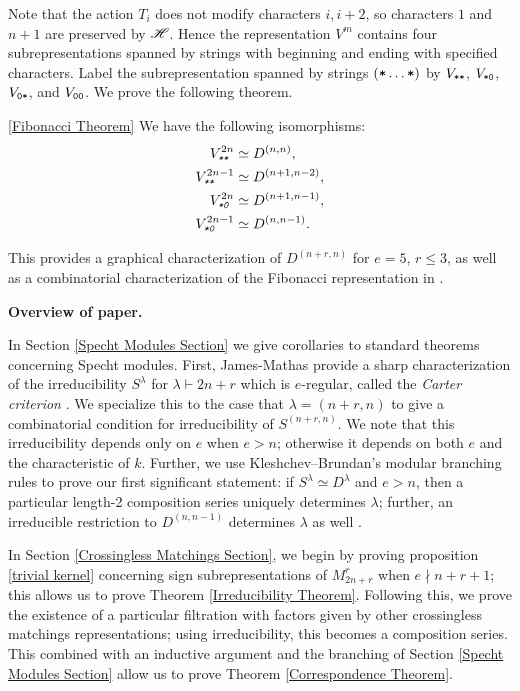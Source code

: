 \documentclass{amsart}
\def\thmcolor{black!60!orange}
\newcommand{\fakesubsection}[1]{
    \vspace{7pt}
    \noindent \textbf{#1.}
  }
\begin{document}
  Note that the action $T_i$ does not modify characters $i,i+2$, so characters $1$ and $n+1$ are preserved by $\mathscr{H}$.
  Hence the representation $V^m$ contains four subrepresentations spanned by strings with beginning and ending with specified characters.
  Label the subrepresentation spanned by strings $(\texttt{*}\dots\texttt{*})$ by $V_{\texttt{*}\texttt{*}}$, $V_{\texttt{*}\texttt{0}}$, $V_{\texttt{0}\texttt{*}}$, and $V_{\texttt{0}\texttt{0}}$.
  We prove the following theorem.
  \begingroup
  \hypersetup{linkcolor=\thmcolor}
  \begin{customthm}{\ref{Fibonacci Theorem}}
    We have the following isomorphisms:
    \begin{align*}  
      \emph{$V^{2n}_{\texttt{*}\texttt{*}}$} &\simeq D^{(n,n)},\\ 
      \emph{$V^{2n-1}_{\texttt{*}\texttt{*}}$} &\simeq D^{(n+1,n-2)},\\
      \emph{$V^{2n}_{\texttt{*}\texttt{0}}$} &\simeq D^{(n+1,n-1)},\\
      \emph{$V^{2n-1}_{\texttt{*}\texttt{0}}$} &\simeq D^{(n,n-1)}.
    \end{align*}
  \end{customthm}
  \endgroup
  This provides a graphical characterization of $D^{(n+r,n)}$ for $e = 5$, $r \leq 3$, as well as a combinatorial characterization of the Fibonacci representation in \cite{Shor}.

  \fakesubsection{Overview of paper}
  
  In Section \ref{Specht Modules Section} we give corollaries to standard theorems concerning Specht modules.
  First, James-Mathas provide a sharp characterization of the irreducibility $S^\lambda$ for $\lambda \vdash 2n + r$ which is $e$-regular, called the \emph{Carter criterion} \cite[Thm.~5.42]{Mathas-book}.
  We specialize this to the case that $\lambda = (n+r,n)$ to give a combinatorial condition for irreducibility of $S^{(n+r,n)}$.
  We note that this irreducibility depends only on $e$ when $e > n$;
  otherwise it depends on both $e$ and the characteristic of $k$.
  Further, we use Kleshchev--Brundan's modular branching rules to prove our first significant statement: if $S^\lambda \simeq D^\lambda$ and $e > n$, then a particular length-2 composition series uniquely determines $\lambda$;
  further, an irreducible restriction to $D^{(n,n-1)}$ determines $\lambda$ as well \cite{Kleshchev, Brundan}.

  \vspace{5pt}
  In Section \ref{Crossingless Matchings Section}, we begin by proving proposition \ref{trivial kernel} concerning sign subrepresentations of $M_{2n + r}^r$ when $e \nmid n + r + 1$;
  this allows us to prove Theorem \ref{Irreducibility Theorem}.
  Following this, we prove the existence of a particular filtration with factors given by other crossingless matchings representations;
  using irreducibility, this becomes a composition series.
  This combined with an inductive argument and the branching of Section \ref{Specht Modules Section} allow us to prove Theorem \ref{Correspondence Theorem}.
  
\end{document}
